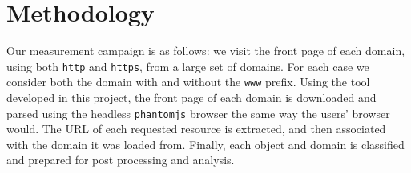 \documentclass[letterpaper]{sig-alternate-10pt}
\begin{document}


\section{Methodology}\label{sec:method}

Our measurement campaign is as follows: 
we visit the front page of each domain, 
using both \texttt{http} and \texttt{https},
from a large set of domains.  
For each case we consider both the domain with and without the \texttt{www} prefix.  
Using the tool developed in this project, 
the front page of each domain is downloaded and parsed using the headless \texttt{phantomjs} browser 
the same way the users' browser would.
The URL of each requested resource is extracted, 
and then associated with the domain it was loaded from.  
Finally, each object and domain is classified and prepared 
for post processing and analysis.
\end{document}
